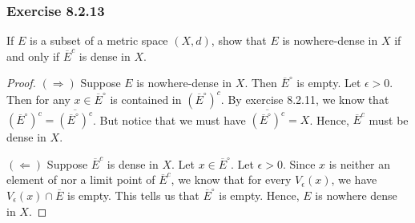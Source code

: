 \subsubsection{Exercise 8.2.13} If \( E  \) is a subset of a metric space \( (X,d) \), show that \( E  \) is nowhere-dense in \( X  \) if and only if \( \overline{E}^{c}  \) is dense in \( X  \). 
\begin{proof}
    \( (\Rightarrow)  \) Suppose \( E  \) is nowhere-dense in \( X  \). Then \( \overline{E}^{\circ}  \) is empty. Let \( \epsilon > 0  \). Then for any \( x \in \overline{E}^{\circ}  \) is contained in \( (\overline{E}^{\circ})^{c} \). By exercise 8.2.11, we know that \( (\overline{E}^{\circ})^{c} = \overline{(\overline{E}^{\circ})^{c}}\). But notice that we must have \( \overline{ (\overline{E}^{\circ})^{c}}  = X   \). Hence, \( \overline{E}^{c} \)  must be dense in \( X  \).

    \( (\Leftarrow) \) Suppose \( \overline{E}^c \) is dense in \( X  \). Let \( x \in \overline{E}^{\circ} \). Let \( \epsilon > 0  \). Since \( x  \) is neither an element of nor a limit point of \( \overline{E}^c \), we know that for every \( V_{\epsilon }(x)   \), we have \( V_{\epsilon }(x) \cap \overline{E} \) is empty. This tells us that \( \overline{E}^{\circ}  \) is empty. Hence, \( E  \) is nowhere dense in \( X  \).
\end{proof}








